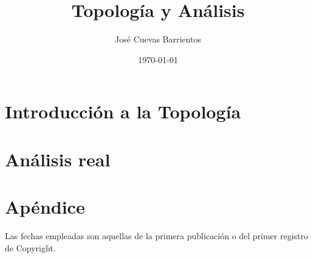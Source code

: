 \documentclass[11pt]{book}
\title{Topología y Análisis}
\author{José Cuevas Barrientos}
\date\today
\begin{document}
\frontmatter
\maketitle
\tableofcontents



\mainmatter
\part{Introducción a la Topología}










\part{Análisis real}








% 

% 

\appendix
\part*{Apéndice}


% 

\listofexample
{}
\printindex
\printnomenclature


\nocite{*}
\printbibheading[heading=bibintoc]
Las fechas empleadas son aquellas de la primera publicación o del primer registro de Copyright.
\bibbycategory
\end{document}
